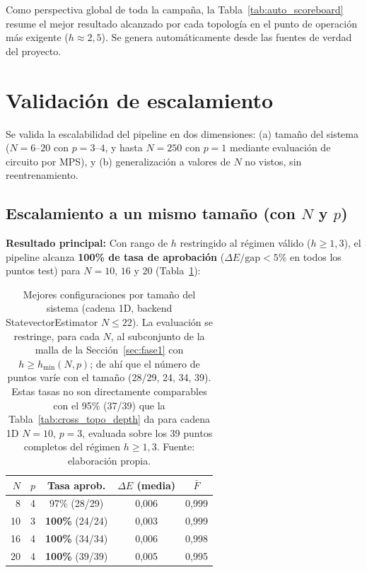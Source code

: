 \documentclass[11pt,a4paper,spanish]{book}
\begin{document}
Como perspectiva global de toda la campaña, la Tabla~\ref{tab:auto_scoreboard} resume el mejor resultado alcanzado por cada topología en el punto de operación más exigente ($h \approx 2,5$). Se genera automáticamente desde las fuentes de verdad del proyecto.



\section{Validación de escalamiento}

Se valida la escalabilidad del pipeline en dos dimensiones: (a) tamaño del sistema ($N = 6$--$20$ con $p = 3$--$4$, y hasta $N = 250$ con $p = 1$ mediante evaluación de circuito por MPS), y (b) generalización a valores de $N$ no vistos, sin reentrenamiento.

\subsection{Escalamiento a un mismo tamaño (con $N$ y $p$)}
\label{subsec:scaling_np}

\textbf{Resultado principal:} Con rango de $h$ restringido al régimen válido ($h \geq 1,3$), el pipeline alcanza \textbf{100\% de tasa de aprobación} ($\Delta E/\text{gap} < 5\%$ en todos los puntos test) para $N = 10$, $16$ y $20$ (Tabla~\ref{tab:scaling}):

\begin{table}[H]
\centering
\caption[Mejores configuraciones por tamaño del sistema (cadena 1D)]{Mejores configuraciones por tamaño del sistema (cadena 1D, backend StatevectorEstimator $N \leq 22$). La evaluación se restringe, para cada $N$, al subconjunto de la malla de la Sección~\ref{sec:fase1} con $h \geq h_{\min}(N,p)$; de ahí que el número de puntos varíe con el tamaño (28/29, 24, 34, 39). Estas tasas no son directamente comparables con el 95\% (37/39) que la Tabla~\ref{tab:cross_topo_depth} da para cadena 1D $N=10$, $p=3$, evaluada sobre los 39 puntos completos del régimen $h \geq 1,3$. Fuente: elaboración propia.}
\label{tab:scaling}
\begin{tabular}{rcccc}
\toprule
\textbf{$N$} & \textbf{$p$} & \textbf{Tasa aprob.} & \textbf{$\Delta E$ (media)} & \textbf{$\bar{F}$} \\
\midrule
8 & 4 & 97\% (28/29) & 0,006 & 0,999 \\
10 & 3 & \textbf{100\%} (24/24) & 0,003 & 0,999 \\
16 & 4 & \textbf{100\%} (34/34) & 0,006 & 0,998 \\
20 & 4 & \textbf{100\%} (39/39) & 0,005 & 0,995 \\
\bottomrule
\end{tabular}
\end{table}
\end{document}
